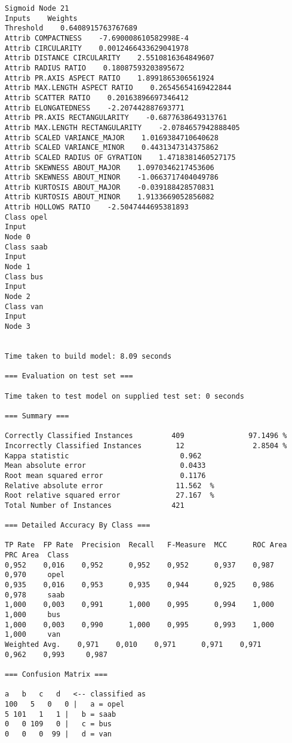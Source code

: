 \documentclass[
	article,			%
	11pt,				%
	oneside,			%
	a4paper,			%
	english,			%
	brazil,				%
	sumario=tradicional
	]{abntex2}
\begin{document}
\begin{lstlisting}
Sigmoid Node 21
Inputs    Weights
Threshold    0.6408915763767689
Attrib COMPACTNESS    -7.690008610582998E-4
Attrib CIRCULARITY    0.0012466433629041978
Attrib DISTANCE CIRCULARITY    2.5510816364849607
Attrib RADIUS RATIO    0.18087593203895672
Attrib PR.AXIS ASPECT RATIO    1.8991865306561924
Attrib MAX.LENGTH ASPECT RATIO    0.26545654169422844
Attrib SCATTER RATIO    0.20163896697346412
Attrib ELONGATEDNESS    -2.207442887693771
Attrib PR.AXIS RECTANGULARITY    -0.6877638649313761
Attrib MAX.LENGTH RECTANGULARITY    -2.0784657942888405
Attrib SCALED VARIANCE_MAJOR    1.0169384710640628
Attrib SCALED VARIANCE_MINOR    0.4431347314375862
Attrib SCALED RADIUS OF GYRATION    1.4718381460527175
Attrib SKEWNESS ABOUT_MAJOR    1.0970346217453606
Attrib SKEWNESS ABOUT_MINOR    -1.0663717404049786
Attrib KURTOSIS ABOUT_MAJOR    -0.039188428570831
Attrib KURTOSIS ABOUT_MINOR    1.9133669052856082
Attrib HOLLOWS RATIO    -2.5047444695381893
Class opel
Input
Node 0
Class saab
Input
Node 1
Class bus
Input
Node 2
Class van
Input
Node 3


Time taken to build model: 8.09 seconds

=== Evaluation on test set ===

Time taken to test model on supplied test set: 0 seconds

=== Summary ===

Correctly Classified Instances         409               97.1496 %
Incorrectly Classified Instances        12                2.8504 %
Kappa statistic                          0.962 
Mean absolute error                      0.0433
Root mean squared error                  0.1176
Relative absolute error                 11.562  %
Root relative squared error             27.167  %
Total Number of Instances              421     

=== Detailed Accuracy By Class ===

TP Rate  FP Rate  Precision  Recall   F-Measure  MCC      ROC Area  PRC Area  Class
0,952    0,016    0,952      0,952    0,952      0,937    0,987     0,970     opel
0,935    0,016    0,953      0,935    0,944      0,925    0,986     0,978     saab
1,000    0,003    0,991      1,000    0,995      0,994    1,000     1,000     bus
1,000    0,003    0,990      1,000    0,995      0,993    1,000     1,000     van
Weighted Avg.    0,971    0,010    0,971      0,971    0,971      0,962    0,993     0,987     

=== Confusion Matrix ===

a   b   c   d   <-- classified as
100   5   0   0 |   a = opel
5 101   1   1 |   b = saab
0   0 109   0 |   c = bus
0   0   0  99 |   d = van


\end{lstlisting}
\end{document}
